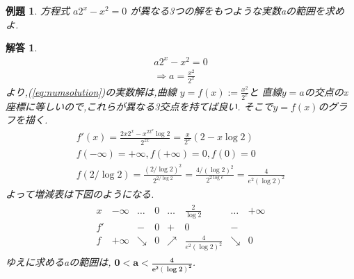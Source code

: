 \documentclass[a4paper,11pt,twocolumn,uplatex]{jsbook}
\newtheorem{example}{例題}[section]
\newtheorem*{solution}{解答}
\begin{document}
\begin{screen}
  \begin{example}
    方程式 $a 2^x - x^2 = 0$ が異なる3つの解をもつような実数aの範囲を求めよ.
  \end{example}
\end{screen}
\begin{solution}
  \begin{eqnarray}
    a 2^x - x^2 = 0 \label{eq:numsolution}\\
    \Rightarrow a = \frac{x^2}{2^x} \nonumber
  \end{eqnarray}
  より,(\ref{eq:numsolution})の実数解は,曲線 $y=f(x):=\frac{x^2}{2^x}$と
  直線$y=a$の交点のx座標に等しいので,これらが異なる3交点を持てば良い.
  そこで$y=f(x)$のグラフを描く.
  \begin{eqnarray*}
    f'(x) = \frac{2x2^x - x^22^x\log 2}{2^{2x}} = \frac{x}{2^x}(2-x\log 2)\\
    f(-\infty)=+\infty, 
    f(+\infty)=0, 
    f(0)=0\\
    f(2/\log 2) = \frac{(2/\log2)^2}{2^{2/\log2}} = \frac{4/(\log2)^2}{2^{2\log e}} 
    = \frac{4}{e^2 (\log2)^2}
  \end{eqnarray*}
  よって増減表は下図のようになる.
  \begin{eqnarray*}
    \begin{array}{c|ccccccc}
      x&-\infty&\dots&0&\dots&\frac{2}{\log2}&\dots&+\infty\\
      f'&&-&0&+&0&-&\\
      f&+\infty&\searrow&0&\nearrow&\frac{4}{e^2(\log2)^2}&\searrow&0
    \end{array}
  \end{eqnarray*}
  ゆえに求めるaの範囲は,
  $\bm{0<a<\frac{4}{e^2(\log2)^2}}$.
\end{solution}
\end{document}

